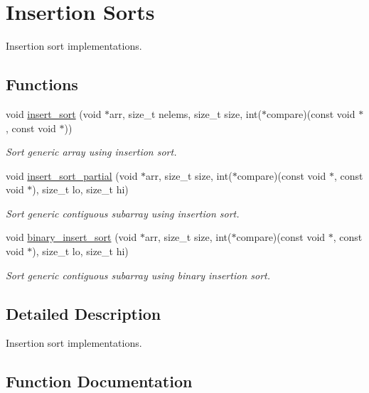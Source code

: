 \hypertarget{group__InsertionSort}{}\section{Insertion Sorts}
\label{group__InsertionSort}


Insertion sort implementations.  


\subsection*{Functions}
\begin{DoxyCompactItemize}
\item 
void \hyperlink{group__InsertionSort_ga262ca6566c76d4587cba88441880a293}{insert\+\_\+sort} (void $\ast$arr, size\+\_\+t nelems, size\+\_\+t size, int($\ast$compare)(const void $\ast$, const void $\ast$))
\begin{DoxyCompactList}\small\item\em Sort generic array using insertion sort. \end{DoxyCompactList}\item 
void \hyperlink{group__InsertionSort_gad147d05ac7625135f328ce4924ac2553}{insert\+\_\+sort\+\_\+partial} (void $\ast$arr, size\+\_\+t size, int($\ast$compare)(const void $\ast$, const void $\ast$), size\+\_\+t lo, size\+\_\+t hi)
\begin{DoxyCompactList}\small\item\em Sort generic contiguous subarray using insertion sort. \end{DoxyCompactList}\item 
void \hyperlink{group__InsertionSort_gaac4076ef31a1984eb307e21d3ce5df0a}{binary\+\_\+insert\+\_\+sort} (void $\ast$arr, size\+\_\+t size, int($\ast$compare)(const void $\ast$, const void $\ast$), size\+\_\+t lo, size\+\_\+t hi)
\begin{DoxyCompactList}\small\item\em Sort generic contiguous subarray using binary insertion sort. \end{DoxyCompactList}\end{DoxyCompactItemize}


\subsection{Detailed Description}
Insertion sort implementations. 



\subsection{Function Documentation}
\mbox{\label{group__InsertionSort_gaac4076ef31a1984eb307e21d3ce5df0a}} 
